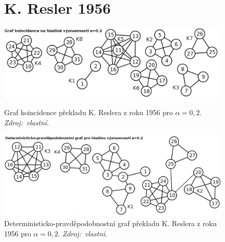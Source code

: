 \documentclass[dp.tex]{subfiles}
\begin{document}
\begin{figure}[h]
\section*{K. Resler 1956}
	\centering
	\includegraphics[max width=\textwidth,keepaspectratio=true]{imgs-99-priloha-d/j_k_20}
	\caption[Graf koincidence překladu K. Reslera z roku 1956 pro $\alpha = 0{,}2$]
            {Graf koincidence překladu K. Reslera z roku 1956 pro $\alpha = 0{,}2$. \textit{Zdroj:~vlastní.}}
	\label{fig:j_k_20}

	\includegraphics[max width=\textwidth,keepaspectratio=true]{imgs-99-priloha-d/j_d_20}
	\caption[Deterministicko-pravděpodobnostní graf překladu K. Reslera z roku 1956 pro $\alpha = 0{,}2$]
            {Deterministicko-pravděpodobnostní graf překladu K. Reslera z roku 1956 pro $\alpha = 0{,}2$. \textit{Zdroj:~vlastní.}}
	\label{fig:j_d_20}
\end{figure}
\end{document}
